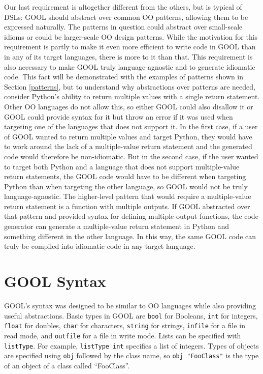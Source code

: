 \documentclass[sigplan,review,anonymous]{acmart}
\begin{document}
Our last requirement is altogether different from the others, but is 
typical of DSLs: GOOL should abstract over common OO patterns, allowing them to 
be expressed naturally. The patterns in question could abstract over 
small-scale idioms or could be larger-scale OO design patterns. While the 
motivation for this requirement is partly to make it even more efficient to 
write code in GOOL than in any of its target languages, there is more to it 
than that. This requirement is also necessary to make GOOL truly 
language-agnostic and to generate idiomatic code. This fact will be 
demonstrated with the examples of patterns shown in Section \ref{patterns}, but 
to understand why abstractions over patterns are needed, consider Python's 
ability to return multiple values with a single return statement. Other OO 
languages do not allow this, so either GOOL could also disallow it or GOOL 
could provide syntax for it but throw an error if it was used when targeting 
one of the languages that does not support it. In the first case, if a user of
GOOL wanted to return multiple values and target Python, they would have to 
work around the lack of a multiple-value return statement and the generated 
code would therefore be non-idiomatic. But in the second case, if the user 
wanted to target both Python and a language that does not support 
multiple-value return statements, the GOOL code would have to be different when 
targeting Python than when targeting the other language, so GOOL would not be 
truly language-agnostic. The higher-level pattern that would require a 
multiple-value return statement is a function with multiple outputs. If GOOL
abstracted over that pattern and provided syntax for defining multiple-output 
functions, the code generator can generate a multiple-value return statement in 
Python and something different in the other language. In this way, the same 
GOOL code can truly be compiled into idiomatic code in any target language.

\section{GOOL Syntax} \label{syntax}

GOOL's syntax was designed to be similar to OO languages while also providing 
useful abstractions. Basic types in GOOL are \verb|bool| for Booleans, 
\verb|int| for integers, \verb|float| for doubles, \verb|char| 
for characters, \verb|string| for strings, \verb|infile| for a file 
in read mode, and \verb|outfile| for a file in write mode. Lists can be 
specified with \verb|listType|. For example, \verb|listType int| 
specifies a list of integers. Types of objects are specified using 
\verb|obj| followed by the class name, so \verb|obj "FooClass"| is the type of 
an object of a class called ``FooClass''. 
\end{document}
